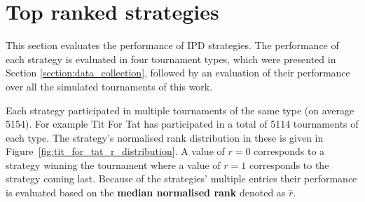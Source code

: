 \begin{table}[!htbp]
    \begin{center}
\end{center}
\caption{Output result of a single tournament.}\label{table:output_result}
\end{table}

\section{Top ranked strategies}\label{section:top_performances}

This section evaluates the performance of \numberofstrategies IPD strategies. The performance of
each strategy is evaluated in four tournament types, which were presented in Section
\ref{section:data_collection}, followed by an evaluation of their performance
over all the \numberofalltournaments simulated tournaments of this work.

Each strategy participated in multiple tournaments of the same type (on average 5154).
For example Tit For Tat has participated in a total of 5114
tournaments of each type. The strategy's normalised rank distribution in these
is given in Figure~\ref{fig:tit_for_tat_r_distribution}. A value of \(r =
0\) corresponds to a strategy winning the tournament where a value of
\(r = 1\) corresponds to the strategy coming last. Because of the strategies'
multiple entries their performance is evaluated based on the
\textbf{median normalised rank} denoted as \(\bar{r}\).

